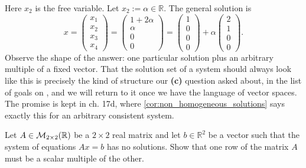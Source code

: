 \begin{example}
Here $x_2$ is the free variable. Let $x_2 := \alpha \in \mathbb{R}$. The general solution is
\[
x = \begin{pmatrix} x_1 \\ x_2 \\ x_3 \\ x_4 \end{pmatrix} = \begin{pmatrix} 1 + 2\alpha \\ \alpha \\ 0 \\ 0 \end{pmatrix} = \begin{pmatrix} 1 \\ 0 \\ 0 \\ 0 \end{pmatrix} + \alpha \begin{pmatrix} 2 \\ 1 \\ 0 \\ 0 \end{pmatrix}.
\]
Observe the shape of the answer: one particular solution plus an arbitrary multiple of a fixed vector. That the solution set of a system should always look like this is precisely the kind of structure our \textbf{(c)} question asked about, in the list of goals on , and we will return to it once we have the language of vector spaces. The promise is kept in ch. 17d, where \cref{cor:non_homogeneous_solutions} says exactly this for an arbitrary consistent system.
\end{example}

\begin{exercise}
\label{exc:inconsistent_2x2_system}
Let $A \in \mathcal{M}_{2 \times 2}(\mathbb{R})$ be a $2 \times 2$ real matrix and let $b \in \mathbb{R}^2$ be a vector such that the system of equations $Ax = b$ has no solutions. Show that one row of the matrix $A$ must be a scalar multiple of the other.
\end{exercise}

